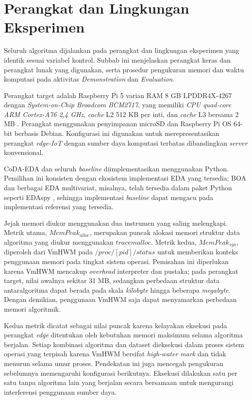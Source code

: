 \section{Perangkat dan Lingkungan Eksperimen}

Seluruh algoritma dijalankan pada perangkat dan lingkungan eksperimen yang identik sesuai variabel kontrol. 
Subbab ini menjelaskan perangkat keras dan perangkat lunak yang digunakan, serta prosedur pengukuran memori dan waktu komputasi pada aktivitas \textit{Demonstration} dan \textit{Evaluation}.

Perangkat target adalah Raspberry Pi 5 varian RAM\label{first:ram} 8 GB LPDDR4X-4267 dengan \textit{System-on-Chip Broadcom BCM2717}, yang memiliki \textit{CPU\label{first:cpu} quad-core ARM Cortex-A76 2,4 GHz}, \textit{cache} L2 512 KB per inti, dan \textit{cache} L3 bersama 2 MB \parencite{raspberry_pi_ltd_raspberry_2026}. 
Perangkat menggunakan penyimpanan microSD dan Raspberry Pi OS 64-bit berbasis Debian. 
Konfigurasi ini digunakan untuk merepresentasikan perangkat \textit{edge-IoT} dengan sumber daya komputasi terbatas dibandingkan \textit{server} konvensional.

CoDA-EDA dan seluruh \textit{baseline} diimplementasikan menggunakan Python. 
Pemilihan ini konsisten dengan ekosistem implementasi EDA yang tersedia; BOA dan berbagai EDA multivariat, misalnya, telah tersedia dalam paket Python seperti EDAspy \parencite{soloviev_edaspy_2024}, sehingga implementasi \textit{baseline} dapat mengacu pada implementasi referensi yang tersedia.

Jejak memori diukur menggunakan dua instrumen yang saling melengkapi. 
Metrik utama, $MemPeak_{alloc}$, merupakan puncak alokasi memori struktur data algoritma yang diukur menggunakan $tracemalloc$. 
Metrik kedua, $MemPeak_{sys}$, diperoleh dari VmHWM\label{first:vmhwm} pada $/proc/[pid]/status$ untuk memberikan konteks penggunaan memori pada tingkat sistem operasi. 
Pemisahan ini diperlukan karena VmHWM mencakup \textit{overhead} interpreter dan pustaka; pada perangkat target, nilai awalnya sekitar 31 MB, sedangkan perbedaan struktur data antaralgoritma dapat berada pada skala \textit{kilobyte} hingga beberapa \textit{megabyte}. 
Dengan demikian, penggunaan VmHWM saja dapat menyamarkan perbedaan memori algoritmik.

Kedua metrik dicatat sebagai nilai puncak karena kelayakan eksekusi pada perangkat \textit{edge} ditentukan oleh kebutuhan memori maksimum selama algoritma berjalan. 
Setiap kombinasi algoritma dan dataset dieksekusi dalam proses sistem operasi yang terpisah karena VmHWM bersifat \textit{high-water mark} dan tidak menurun selama umur proses. 
Pendekatan ini juga mencegah pengukuran sebelumnya memengaruhi konfigurasi berikutnya. 
Eksekusi dilakukan satu per satu tanpa algoritma lain yang berjalan secara bersamaan untuk mengurangi interferensi penggunaan sumber daya.

